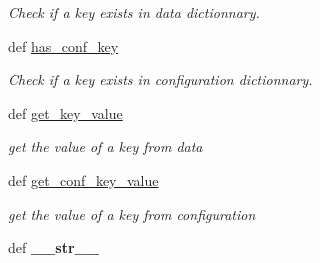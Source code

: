 \begin{CompactItemize}
\begin{CompactList}\small\item\em Check if a key exists in data dictionnary. \item\end{CompactList}\item 
\hypertarget{classxPLAPI_1_1Message_8bc93e1bab48128e660be2d1e8ac7199}{
def \hyperlink{classxPLAPI_1_1Message_8bc93e1bab48128e660be2d1e8ac7199}{has\_\-conf\_\-key}}
\label{classxPLAPI_1_1Message_8bc93e1bab48128e660be2d1e8ac7199}

\begin{CompactList}\small\item\em Check if a key exists in configuration dictionnary. \item\end{CompactList}\item 
\hypertarget{classxPLAPI_1_1Message_80231e4e96a2247263ed3d2bb7f9cbf3}{
def \hyperlink{classxPLAPI_1_1Message_80231e4e96a2247263ed3d2bb7f9cbf3}{get\_\-key\_\-value}}
\label{classxPLAPI_1_1Message_80231e4e96a2247263ed3d2bb7f9cbf3}

\begin{CompactList}\small\item\em get the value of a key from data \item\end{CompactList}\item 
\hypertarget{classxPLAPI_1_1Message_de17ca84597e627ae63f9b1cf5a4b284}{
def \hyperlink{classxPLAPI_1_1Message_de17ca84597e627ae63f9b1cf5a4b284}{get\_\-conf\_\-key\_\-value}}
\label{classxPLAPI_1_1Message_de17ca84597e627ae63f9b1cf5a4b284}

\begin{CompactList}\small\item\em get the value of a key from configuration \item\end{CompactList}\item 
\hypertarget{classxPLAPI_1_1Message_4d5b950513dedc31dfe0dcf51823c43d}{
def \textbf{\_\-\_\-str\_\-\_\-}}
\label{classxPLAPI_1_1Message_4d5b950513dedc31dfe0dcf51823c43d}

\end{CompactItemize}
